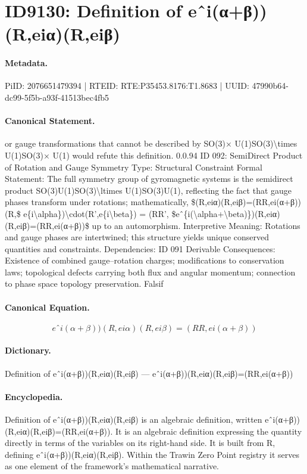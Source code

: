 \section*{ID9130: Definition of eˆi(α+β))(R,eiα)(R,eiβ)}
\paragraph{Metadata.}
PiID: 2076651479394 | RTEID: RTE:P35453.8176:T1.8683 | UUID: 47990b64-dc99-5f5b-a93f-41513bec4fb5

\paragraph{Canonical Statement.}
or gauge transformations that cannot be described by SO(3)× U(1)SO(3)\textbackslash{}times U(1)SO(3)× U(1) would refute this definition. 0.0.94 ID 092: SemiDirect Product of Rotation and Gauge Symmetry Type: Structural Constraint Formal Statement: The full symmetry group of gyromagnetic systems is the semidirect product SO(3)U(1)SO(3)\textbackslash{}ltimes U(1)SO(3)U(1), reflecting the fact that gauge phases transform under rotations; mathematically, \$(R,eiα)(R,eiβ)=(RR,ei(α+β))(R,\$ e\{i\textbackslash{}alpha\})\textbackslash{}cdot(R’,e\{i\textbackslash{}beta\}) = (RR’, \$eˆ\{i(\textbackslash{}alpha+\textbackslash{}beta)\})(R,eiα)(R,eiβ)=(RR,ei(α+β))\$ up to an automorphism. Interpretive Meaning: Rotations and gauge phases are intertwined; this structure yields unique conserved quantities and constraints. Dependencies: ID 091 Derivable Consequences: Existence of combined gauge–rotation charges; modifications to conservation laws; topological defects carrying both flux and angular momentum; connection to phase space topology preservation. Falsif

\paragraph{Canonical Equation.}
\[
eˆ{i(\alpha+\beta)})(R,eiα)(R,eiβ)=(RR,ei(α+β))
\]

\paragraph{Dictionary.}
Definition of eˆi(α+β))(R,eiα)(R,eiβ) — eˆi(α+β))(R,eiα)(R,eiβ)=(RR,ei(α+β))

\paragraph{Encyclopedia.}
Definition of eˆi(α+β))(R,eiα)(R,eiβ) is an algebraic definition, written eˆi(α+β))(R,eiα)(R,eiβ)=(RR,ei(α+β)). It is an algebraic definition expressing the quantity directly in terms of the variables on its right-hand side. It is built from R, defining eˆi(α+β))(R,eiα)(R,eiβ). Within the Trawin Zero Point registry it serves as one element of the framework's mathematical narrative.
